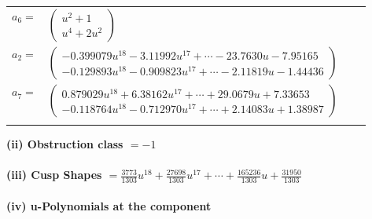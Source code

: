 \documentclass[1p]{elsarticle_modified}
\theoremstyle{definition}
\begin{document}
\begin{tabular}{m{7pt} m{180pt} m{7pt} m{180pt} }
\flushright $a_{6}=$&$\begin{pmatrix}u^2+1\\u^4+2 u^2\end{pmatrix}$ \\
\flushright $a_{2}=$&$\begin{pmatrix}-0.399079 u^{18}-3.11992 u^{17}+\cdots-23.7630 u-7.95165\\-0.129893 u^{18}-0.909823 u^{17}+\cdots-2.11819 u-1.44436\end{pmatrix}$ \\
\flushright $a_{7}=$&$\begin{pmatrix}0.879029 u^{18}+6.38162 u^{17}+\cdots+29.0679 u+7.33653\\-0.118764 u^{18}-0.712970 u^{17}+\cdots+2.14083 u+1.38987\end{pmatrix}$\\&\end{tabular}
\flushleft \textbf{(ii) Obstruction class $= -1$}\\~\\
\flushleft \textbf{(iii) Cusp Shapes $= \frac{3773}{1303} u^{18}+\frac{27698}{1303} u^{17}+\cdots+\frac{165236}{1303} u+\frac{31950}{1303}$}\\~\\
\newpage\renewcommand{\arraystretch}{1}
\flushleft \textbf{(iv) u-Polynomials at the component}\newline \\
\end{document}
